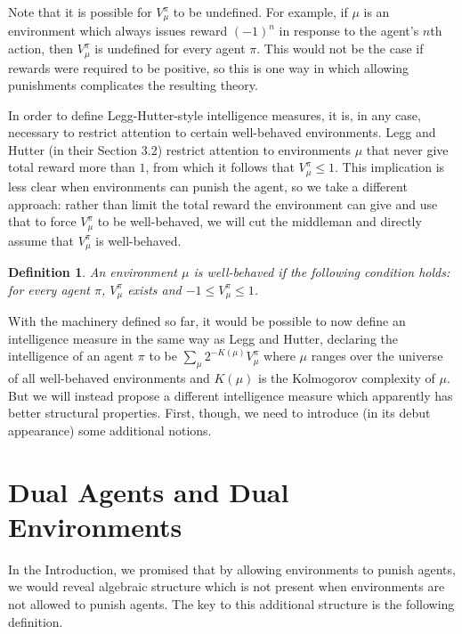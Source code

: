\documentclass{article}
\newtheorem{definition}[theorem]{Definition}
\begin{document}
Note that it is possible for $V^\pi_\mu$ to be undefined.
For example, if $\mu$ is an environment which always issues
reward $(-1)^n$ in response to the agent's $n$th action,
then $V^\pi_\mu$ is undefined for every agent $\pi$.
This would not be the case if rewards were required to be positive,
so this is one way in which allowing
punishments complicates the resulting theory.

In order to define Legg-Hutter-style
intelligence measures, it is, in any case, necessary to restrict attention to
certain well-behaved environments. Legg and Hutter (in their Section 3.2)
restrict attention to environments $\mu$ that never give total reward more than $1$,
from which it follows that $V^\pi_\mu\leq 1$. This implication is less clear
when environments can punish the agent, so we take a different approach:
rather than limit the total reward the environment can give and use that to
force $V^\pi_\mu$ to be well-behaved, we will cut the middleman and
directly assume that $V^\pi_\mu$ is well-behaved.

\begin{definition}
    An environment $\mu$ is \emph{well-behaved} if the following
    condition holds: for every agent $\pi$, $V^\pi_\mu$ exists and
    $-1\leq V^\pi_\mu\leq 1$.
\end{definition}

With the machinery defined so far, it would be possible to now define an
intelligence measure in the same way as Legg and Hutter,
declaring the intelligence of an agent $\pi$ to be
$\sum_{\mu} 2^{-K(\mu)}V^\pi_\mu$ where $\mu$ ranges over the universe
of all well-behaved environments and $K(\mu)$ is the Kolmogorov complexity
of $\mu$. But we will instead propose a different intelligence measure
which apparently has better structural properties. First, though, we need
to introduce (in its debut appearance) some additional notions.

\section{Dual Agents and Dual Environments}

In the Introduction, we promised that by allowing environments to punish agents,
we would reveal algebraic structure which is not present when environments are
not allowed to punish agents. The key to this additional structure is the following
definition.
\end{document}
